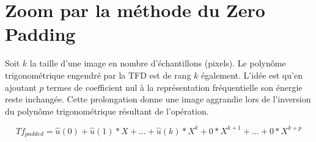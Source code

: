 \documentclass[12pt]{article}
\begin{document}
\section*{Zoom par la méthode du Zero Padding}

Soit $k$ la taille d'une image en nombre d'échantillons (pixels). 
Le polynôme trigonométrique engendré par la TFD est de rang $k$ également. 
L'idée est qu'en ajoutant $p$ termes de coefficient nul à la représentation fréquentielle son énergie reste inchangée. 
Cette prolongation donne une image aggrandie lors de l'inversion du polynôme trigonométrique résultant de l'opération.

\begin{equation}
    Tf_{padded} = \hat{u}(0) + \hat{u}(1) * X + ... + \hat{u}(k) * X^k + 0*X^{k+1} + ... + 0*X^{k+p}
\end{equation}
\end{document}
